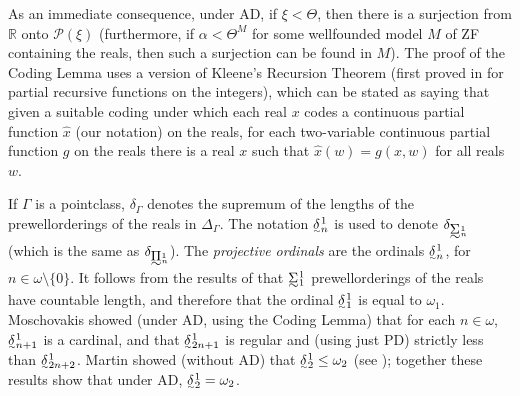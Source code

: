 \documentclass{book}%
\def\underTilde#1{{\baselineskip=0pt\vtop{\hbox{$#1$}\hbox{$\sim$}}}{}}
\def\undertilde#1{{\baselineskip=0pt\vtop
  {\hbox{$#1$}\hbox{$\scriptscriptstyle\sim$}}}{}}
\newcommand{\uTPi}{\underTilde{\Pi}}
\newcommand{\uTSigma}{\underTilde{\Sigma}}
\newcommand{\utdelta}{\undertilde{\delta}}
\begin{document}
As an immediate consequence, under AD, if $\xi < \Theta$, then there is a surjection from
$\mathbb{R}$ onto $\mathcal{P}(\xi)$ (furthermore, if $\alpha <
\Theta^{M}$ for some wellfounded model $M$ of ZF containing the reals, then such a surjection can be found in
$M$). The proof of the Coding Lemma uses a version of Kleene's Recursion Theorem
(first proved in \cite{Kleene:1938} for partial recursive functions on the integers), which can be stated as saying that
given a suitable coding under which each real $x$ codes a continuous partial function $\hat{x}$ (our notation) on the reals,
for each two-variable continuous partial function $g$ on the reals there is a real $x$ such that $\hat{x}(w) = g(x,w)$
for all reals $w$.

If $\Gamma$ is a pointclass,
$\delta_{\Gamma}$  denotes the
supremum of the lengths of the prewellorderings of the reals in
$\Delta_{\Gamma}$.
The notation $\undertilde{\delta}^{1}_{n}$ is used to denote
$\delta_{\uTSigma^{1}_{n}}$ (which is the same as
$\delta_{\uTPi^{1}_{n}}$). The \emph{projective
ordinals}\index{$\delta^1_n$1@$\boldsymbol{\delta}^1_n$ (= $\undertilde{\delta}^1_n$)}
are the ordinals $\utdelta^{1}_{n}$, for $n \in \omega \setminus \{0\}$.
It follows from the results of \cite{LuzinSierpinski:1923} that $\uTSigma^{1}_{1}$ prewellorderings of the
reals have countable length, and therefore that the ordinal $\undertilde{\delta}^{1}_{1}$ is
equal to $\omega_{1}$. Moschovakis 
showed (under AD, using the Coding Lemma) that for each $n \in
\omega$, $\undertilde{\delta}^{1}_{n+1}$ is a cardinal, and that
$\undertilde{\delta}^{1}_{2n+1}$ is regular and (using just PD) strictly less
than $\undertilde{\delta}^{1}_{2n+2}$. Martin showed (without AD)
that $\undertilde{\delta}^{1}_{2} \leq \omega_{2}$ (see \cite{KechrisMoschovakis:1978}); together these
results show that under AD, $\undertilde{\delta}^{1}_{2} =
\omega_{2}$.
\end{document}
